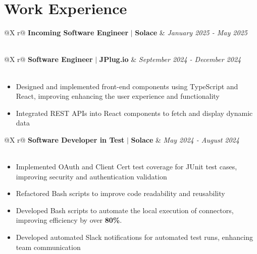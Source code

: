 \documentclass[a4paper,12pt]{article}
\begin{document}

\section{Work Experience}

\begin{tabularx}{\linewidth}{ @{}X r@{} }
    {\textbf{Incoming Software Engineer}} $\vert$ {\textbf{Solace}} & \textit{January 2025 - May 2025} \\
     \\
\end{tabularx}


\begin{tabularx}{\linewidth}{ @{}X r@{} }
    {\textbf{Software Engineer}} $\vert$ {\textbf{JPlug.io}} & \textit{September 2024 - December 2024} \\
     \\
\end{tabularx}

\begin{itemize} [nosep,leftmargin=*]
    \item Designed and implemented front-end components using TypeScript and React, improving enhancing the user experience and functionality
    \item Integrated REST APIs into React components to fetch and display dynamic data
\end{itemize}

\begin{tabularx}{\linewidth}{ @{}X r@{} }
    {\textbf{Software Developer in Test}} $\vert$ {\textbf{Solace}} & \textit{May 2024 - August 2024} \\
     \\
\end{tabularx}
\begin{itemize} [nosep,leftmargin=*]
    \item Implemented OAuth and Client Cert test coverage for JUnit test cases, improving security and authentication validation 
    \item Refactored Bash scripts to improve code readability and reusability 
    \item Developed Bash scripts to automate the local execution of connectors, improving efficiency by over \textbf{80\%}.
    \item Developed automated Slack notifications for automated test runs, enhancing team communication
\end{itemize}
\end{document}

